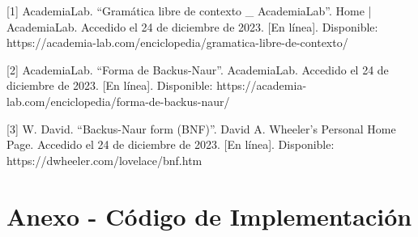 \documentclass[11pt]{article} %
\begin{document}
	
	[1] AcademiaLab. “Gramática libre de contexto \_ AcademiaLab”. Home | AcademiaLab. Accedido el 24 de diciembre de 2023. [En línea]. Disponible: https://academia-lab.com/enciclopedia/gramatica-libre-de-contexto/
	
	[2] AcademiaLab. “Forma de Backus-Naur”. AcademiaLab. Accedido el 24 de diciembre de 2023. [En línea]. Disponible: https://academia-lab.com/enciclopedia/forma-de-backus-naur/
	
	[3] W. David. “Backus-Naur form (BNF)”. David A. Wheeler's Personal Home Page. Accedido el 24 de diciembre de 2023. [En línea]. Disponible: https://dwheeler.com/lovelace/bnf.htm
	
	
	
	\newpage
	\section{Anexo - Código de Implementación}
	
\end{document}
